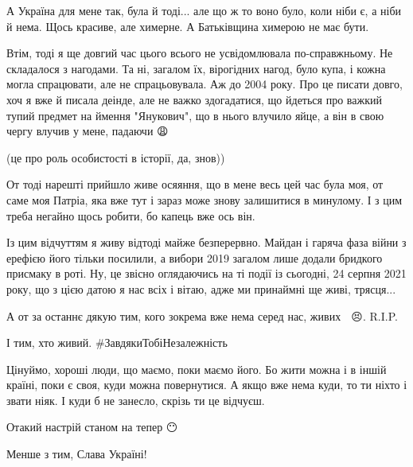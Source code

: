 А Україна для мене так, була й тоді... але що ж то воно було, коли ніби є, а
ніби й нема. Щось красиве, але химерне. А Батьківщина химерою не має бути.

Втім, тоді я ще довгий час цього всього не усвідомлювала по-справжньому. Не
складалося з нагодами. Та ні, загалом їх, вірогідних нагод, було купа, і кожна
могла спрацювати, але не спрацьовувала. Аж до 2004 року. Про це писати довго,
хоч я вже й писала деінде, але не важко здогадатися, що йдеться про важкий
тупий предмет на ймення "Янукович", що в нього влучило яйце, а він в свою чергу
влучив у мене, падаючи 😩

(це про роль особистості в історії, да, знов))

От тоді нарешті прийшло живе осяяння, що в мене весь цей час була моя, от саме
моя Патріа, яка вже тут і зараз може знову залишитися в минулому. І з цим треба
негайно щось робити, бо капець вже ось він.

Із цим відчуттям я живу відтоді майже безперервно. Майдан і гаряча фаза війни з
ерефією його тільки посилили, а вибори 2019 загалом лише додали бридкого
присмаку в роті. Ну, це звісно оглядаючись на ті події із сьогодні, 24 серпня
2021 року, що з цією датою я нас всіх і вітаю, адже ми принаймні ще живі,
трясця...

А от за останнє дякую тим, кого зокрема вже нема серед нас, живих 🙏 😣.     R.I.P.

І тим, хто живий. \#ЗавдякиТобіНезалежність

Цінуймо, хороші люди, що маємо, поки маємо його. Бо жити можна і в іншій
країні, поки є своя, куди можна повернутися. А якщо вже нема куди, то ти ніхто
і звати ніяк. І куди б не занесло, скрізь ти це відчуєш.

Отакий настрій станом на тепер 😶😬

Менше з тим, Слава Україні!
